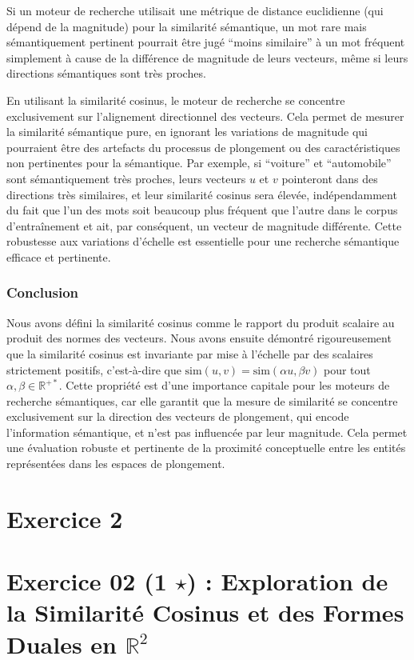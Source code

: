 \documentclass[11pt,a4paper]{report}
\begin{document}
\begin{enumerate}
  Si un moteur de recherche utilisait une métrique de distance
  euclidienne (qui dépend de la magnitude) pour la similarité
  sémantique, un mot rare mais sémantiquement pertinent pourrait être
  jugé ``moins similaire'' à un mot fréquent simplement à cause de la
  différence de magnitude de leurs vecteurs, même si leurs directions
  sémantiques sont très proches.

  En utilisant la similarité cosinus, le moteur de recherche se
  concentre exclusivement sur l'alignement directionnel des vecteurs.
  Cela permet de mesurer la similarité sémantique pure, en ignorant les
  variations de magnitude qui pourraient être des artefacts du processus
  de plongement ou des caractéristiques non pertinentes pour la
  sémantique. Par exemple, si ``voiture'' et ``automobile'' sont
  sémantiquement très proches, leurs vecteurs \(u\) et \(v\) pointeront
  dans des directions très similaires, et leur similarité cosinus sera
  élevée, indépendamment du fait que l'un des mots soit beaucoup plus
  fréquent que l'autre dans le corpus d'entraînement et ait, par
  conséquent, un vecteur de magnitude différente. Cette robustesse aux
  variations d'échelle est essentielle pour une recherche sémantique
  efficace et pertinente.
\end{enumerate}

\hypertarget{conclusion}{%
\subsubsection{Conclusion}\label{conclusion}}

Nous avons défini la similarité cosinus comme le rapport du produit
scalaire au produit des normes des vecteurs. Nous avons ensuite démontré
rigoureusement que la similarité cosinus est invariante par mise à
l'échelle par des scalaires strictement positifs, c'est-à-dire que
\(\text{sim}(u, v) = \text{sim}(\alpha u, \beta v)\) pour tout
\(\alpha, \beta \in \mathbb{R}^{+*}\). Cette propriété est d'une
importance capitale pour les moteurs de recherche sémantiques, car elle
garantit que la mesure de similarité se concentre exclusivement sur la
direction des vecteurs de plongement, qui encode l'information
sémantique, et n'est pas influencée par leur magnitude. Cela permet une
évaluation robuste et pertinente de la proximité conceptuelle entre les
entités représentées dans les espaces de plongement.


\section*{Exercice 2}
\hypertarget{exercice-02-1-star-exploration-de-la-similarituxe9-cosinus-et-des-formes-duales-en-mathbbr2}{%
\section{\texorpdfstring{Exercice 02 (1 \(\star\)) : Exploration de la
Similarité Cosinus et des Formes Duales en
\(\mathbb{R}^2\)}{Exercice 02 (1 \textbackslash star) : Exploration de la Similarité Cosinus et des Formes Duales en \textbackslash mathbb\{R\}\^{}2}}\label{exercice-02-1-star-exploration-de-la-similarituxe9-cosinus-et-des-formes-duales-en-mathbbr2}}
\end{document}
